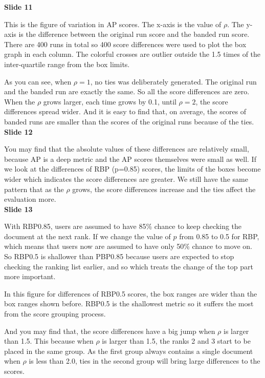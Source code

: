 \documentclass{article}
\begin{document}
\textbf{Slide 11}

This is the figure of variation in AP scores. The x-axis is the value of $\rho$. The y-axis is the difference between the original run score and the banded run score. There are 400 runs in total so 400 score differences were used to plot the box graph in each column. The colorful crosses are outlier outside the 1.5 times of the inter-quartile range from the box limits.

As you can see, when $\rho=1$, no ties was deliberately generated. The original run and the banded run are exactly the same. So all the score differences are zero. When the $\rho$ grows larger, each time grows by 0.1, until $\rho=2$, the score differences spread wider. And it is easy to find that, on average, the scores of banded runs are smaller than the scores of the original runs because of the ties.\\[1em]

\textbf{Slide 12}

You may find that the absolute values of these differences are relatively small, because AP is a deep metric and the AP scores themselves were small as well. If we look at the differences of RBP (p=0.85) scores, the limits of the boxes become wider which indicates the score differences are greater. We still have the same pattern that as the $\rho$ grows, the score differences increase and the ties affect the evaluation more. \\[1em]

\textbf{Slide 13}

With RBP0.85, users are assumed to have 85\% chance to keep checking the document at the next rank. If we change the value of $p$ from 0.85 to 0.5 for RBP, which means that users now are assumed to have only 50\% chance to move on. So RBP0.5 is shallower than PBP0.85 because users are expected to stop checking the ranking list earlier, and so which treats the change of the top part more important. 

In this figure for differences of RBP0.5 scores, the box ranges are wider than the box ranges shown before. RBP0.5 is the shallowest metric so it suffers the most from the score grouping process.

And you may find that, the score differences have a big jump when $\rho$ is larger than 1.5. This because when $\rho$ is larger than 1.5, the ranks 2 and 3 start to be placed in the same group. As the first group always contains a single document when $\rho$ is less than 2.0, ties in the second group will bring large differences to the scores.\\[1em]
\end{document}
